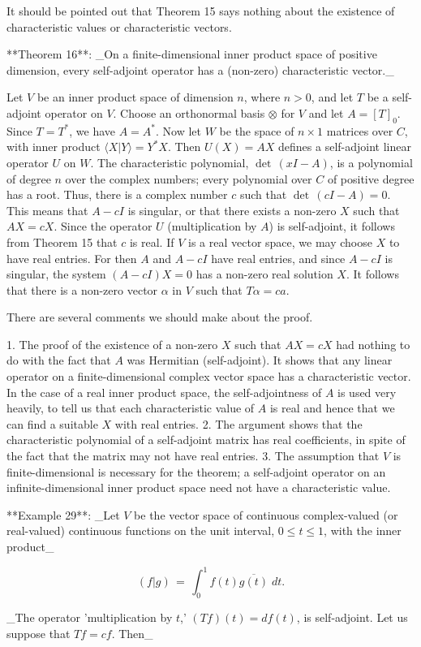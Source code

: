It should be pointed out that Theorem 15 says nothing about the existence of characteristic values or characteristic vectors.

**Theorem 16**: _On a finite-dimensional inner product space of positive dimension, every self-adjoint operator has a (non-zero) characteristic vector._

Let \(V\) be an inner product space of dimension \(n\), where \(n>0\), and let \(T\) be a self-adjoint operator on \(V\). Choose an orthonormal basis \(\otimes\) for \(V\) and let \(A=[T]_{0}\). Since \(T=T^{*}\), we have \(A=A^{*}\). Now let \(W\) be the space of \(n\times 1\) matrices over \(C\), with inner product \(\langle X|Y\rangle=Y^{*}X\). Then \(U(X)=AX\) defines a self-adjoint linear operator \(U\) on \(W\). The characteristic polynomial, \(\det\,(xI-A)\), is a polynomial of degree \(n\) over the complex numbers; every polynomial over \(C\) of positive degree has a root. Thus, there is a complex number \(c\) such that \(\det\,(cI-A)=0\). This means that \(A-cI\) is singular, or that there exists a non-zero \(X\) such that \(AX=cX\). Since the operator \(U\) (multiplication by \(A\)) is self-adjoint, it follows from Theorem 15 that \(c\) is real. If \(V\) is a real vector space, we may choose \(X\) to have real entries. For then \(A\) and \(A-cI\) have real entries, and since \(A-cI\) is singular, the system \((A-cI)X=0\) has a non-zero real solution \(X\). It follows that there is a non-zero vector \(\alpha\) in \(V\) such that \(T\alpha=ca\).

There are several comments we should make about the proof.

1. The proof of the existence of a non-zero \(X\) such that \(AX=cX\) had nothing to do with the fact that \(A\) was Hermitian (self-adjoint). It shows that any linear operator on a finite-dimensional complex vector space has a characteristic vector. In the case of a real inner product space, the self-adjointness of \(A\) is used very heavily, to tell us that each characteristic value of \(A\) is real and hence that we can find a suitable \(X\) with real entries.
2. The argument shows that the characteristic polynomial of a self-adjoint matrix has real coefficients, in spite of the fact that the matrix may not have real entries.
3. The assumption that \(V\) is finite-dimensional is necessary for the theorem; a self-adjoint operator on an infinite-dimensional inner product space need not have a characteristic value.

**Example 29**: _Let \(V\) be the vector space of continuous complex-valued (or real-valued) continuous functions on the unit interval, \(0\leq t\leq 1\), with the inner product_

\[(f|g)\,=\,\int_{0}^{1}f(t)\overline{g(t)}\;dt.\]

_The operator 'multiplication by \(t\),' \((Tf)(t)=df(t)\), is self-adjoint. Let us suppose that \(Tf=cf\). Then_ 